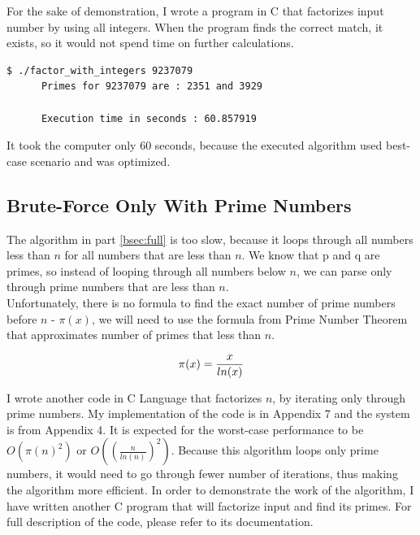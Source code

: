 \documentclass[a4paper, 12pt]{article}
\begin{document}
For the sake of demonstration, I wrote a program in C that factorizes input number by using all integers. When the program
finds the correct match, it exists, so it would not spend time on further calculations.\cite{github}

\begin{center}
\begin{lstlisting}[caption=Demonstartion of Prime Factorization with Integers]
      $ ./factor_with_integers 9237079            
      Primes for 9237079 are : 2351 and 3929

      Execution time in seconds : 60.857919
  \end{lstlisting}
\end{center}

It took the computer only 60 seconds, because the executed algorithm used best-case scenario and was optimized.\cite{github}

\subsection{Brute-Force Only With Prime Numbers}
\label{bsec:primes}

The algorithm in part \ref{bsec:full} is too slow, because it loops through all numbers less than $n$ for all
numbers that are less than $n$. We know that p and q are primes, so instead of looping through all
numbers below $n$, we can parse only through prime numbers that are less than $n$.\\
Unfortunately, there is no formula to find the exact number of prime numbers before $n$ - $\pi(x)$, we will need to use
the formula from Prime Number Theorem that approximates number of primes that less than $n$\cite{pi}.

\begin{equation}
  \pi(x)=\frac{x}{ln(x)}\\
  \end{equation}

I wrote another code in C\cite{Clang} Language that factorizes $n$, by iterating only through prime
numbers. My implementation of the code is in Appendix 7 and the system is from Appendix 4.
It is expected for the worst-case performance to be $O(\pi(n)^2)$ or $O((\frac{n}{ln(n)})^2)$.
Because this algorithm loops only prime
numbers, it would need to go through fewer number of iterations, thus making the algorithm more efficient.
In order to demonstrate the work of the algorithm, I have written another C program that will factorize
input and find its primes. For full description of the code, please refer to its documentation.
\end{document}
